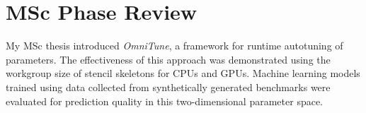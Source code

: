 \documentclass[11pt]{article}
\begin{document}




  \section{MSc Phase Review}

  My MSc thesis introduced \textit{OmniTune}, a framework for runtime
  autotuning of parameters. The effectiveness of this approach was
  demonstrated using the workgroup size of stencil skeletons for CPUs
  and GPUs. Machine learning models trained using data collected from
  synthetically generated benchmarks were evaluated for prediction
  quality in this two-dimensional parameter space.
\end{document}
